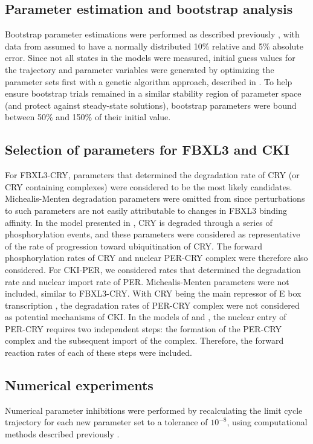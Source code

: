 \subsection{Parameter estimation and bootstrap analysis}
Bootstrap parameter estimations were performed as described previously \cite{St.John2013}, with data from \cite{Lee2001} assumed to have a normally distributed 10\% relative and 5\% absolute error. 
Since not all states in the models were measured, initial guess values for the trajectory and parameter variables were generated by optimizing the parameter sets first with a genetic algorithm approach, described in \cite{Mirsky2009}. 
To help ensure bootstrap trials remained in a similar stability region of parameter space (and protect against steady-state solutions), bootstrap parameters were bound between 50\% and 150\% of their initial value. 

\subsection{Selection of parameters for FBXL3 and CKI}
For FBXL3-CRY, parameters that determined the degradation rate of CRY (or CRY containing complexes) were considered to be the most likely candidates. 
Michealis-Menten degradation parameters were omitted from  since perturbations to such parameters are not easily attributable to changes in FBXL3 binding affinity. 
In the model presented in \cite{Leloup2003}, CRY is degraded through a series of phosphorylation events, and these parameters were considered as representative of the rate of progression toward ubiquitination of CRY. 
The forward phosphorylation rates of CRY and nuclear PER-CRY complex were therefore also considered. 
 For CKI-PER, we considered rates that determined the degradation rate and nuclear import rate of PER. 
Michealis-Menten parameters were not included, similar to FBXL3-CRY. 
With CRY being the main repressor of E box transcription \cite{Ye2011}, the degradation rates of PER-CRY complex were not considered as potential mechanisms of CKI. 
In the models of \cite{Leloup2003} and \cite{Relogio2011}, the nuclear entry of PER-CRY requires two independent steps: the formation of the PER-CRY complex and the subsequent import of the complex. 
Therefore, the forward reaction rates of each of these steps were included. 

\subsection{Numerical experiments}
Numerical parameter inhibitions were performed by recalculating the limit cycle trajectory for each new parameter set to a tolerance of $10^{-8}$, using computational methods described previously \cite{Wilkins2009}.


